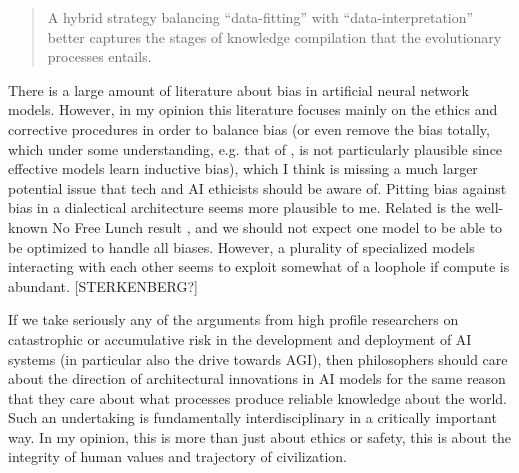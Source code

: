 \begin{quote}
    A hybrid strategy balancing ``data-fitting'' with ``data-interpretation'' better captures the stages of knowledge compilation that the evolutionary processes entails. \citep[p. 80]{Pearl2021}
\end{quote}





There is a large amount of literature about bias in artificial neural network models.  However, in my opinion this literature focuses mainly on the ethics and corrective procedures in order to balance bias (or even remove the bias totally, which under some  understanding, e.g. that of \citep{Mitchell1980}, is not particularly plausible since effective models learn inductive bias), which I think is missing a much larger potential issue that tech and AI ethicists should be aware of.  Pitting bias against bias in a dialectical architecture seems more plausible to me.  Related is the well-known No Free Lunch result \citep{Wolpertetal1997}, and we should not expect one model to be able to be optimized to handle all biases.  However, a plurality of specialized models interacting with each other seems to exploit somewhat of a loophole if compute is abundant. [STERKENBERG?]


If we take seriously any of the arguments from high profile researchers on catastrophic or accumulative risk in the development and deployment of AI systems (in particular also the drive towards AGI), then philosophers should care about the direction of architectural innovations in AI models for the same reason that they care about what processes produce reliable knowledge about the world.  Such an undertaking is fundamentally interdisciplinary in a critically important way.  In my opinion, this is more than just about ethics or safety, this is about the integrity of human values and trajectory of civilization.
